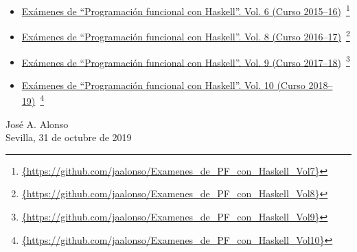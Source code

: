 \documentclass[a4paper,12pt,twoside]{book}
\begin{document}
\begin{itemize}
\item
  \href{https://github.com/jaalonso/Examenes_de_PF_con_Haskell_Vol7}
  {Exámenes de ``Programaci\'on funcional con Haskell''.
    Vol. 6 (Curso 2015--16)}\
    \footnote{\url{{https://github.com/jaalonso/Examenes_de_PF_con_Haskell_Vol7}}}

\item
  \href{https://github.com/jaalonso/Examenes_de_PF_con_Haskell_Vol8}
  {Exámenes de ``Programaci\'on funcional con Haskell''.
    Vol. 8 (Curso 2016--17)}\
    \footnote{\url{{https://github.com/jaalonso/Examenes_de_PF_con_Haskell_Vol8}}}

\item
  \href{https://github.com/jaalonso/Examenes_de_PF_con_Haskell_Vol9}
  {Exámenes de ``Programaci\'on funcional con Haskell''.
    Vol. 9 (Curso 2017--18)}\
    \footnote{\url{{https://github.com/jaalonso/Examenes_de_PF_con_Haskell_Vol9}}}

\item
  \href{https://github.com/jaalonso/Examenes_de_PF_con_Haskell_Vol10}
  {Exámenes de ``Programaci\'on funcional con Haskell''.
    Vol. 10 (Curso 2018--19)}\
    \footnote{\url{{https://github.com/jaalonso/Examenes_de_PF_con_Haskell_Vol10}}}

\end{itemize}
     
\begin{flushright}
  José A. Alonso \\
  Sevilla, 31 de octubre de 2019
\end{flushright}
\end{document}
